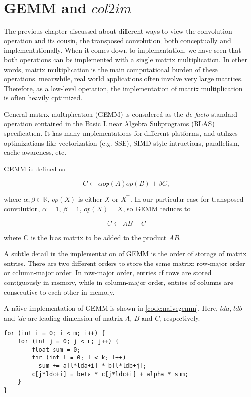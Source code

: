 
\chapter{GEMM and $col2im$}

The previous chapter discussed about different ways to view the convolution operation and its cousin,
the transposed convolution, both conceptually and implementationally. When it comes down to implementation,
we have seen that both operations can be implemented with a single matrix multiplication. In other words,
matrix multiplication is the main computational burden of these operations, meanwhile, real world applications
often involve very large matrices. Therefore, as a low-level operation, the implementation of matrix
multiplication is often heavily optimized.

General matrix multiplication (GEMM) is considered as the \textit{de facto} standard operation
contained in the Basic Linear Algebra Subprograms (BLAS) specification. It has many implementations for
different platforms, and utilizes optimizations like vectorization (e.g. SSE), SIMD-style intructions,
parallelism, cache-awareness, etc.


GEMM is defined as

$$C \leftarrow \alpha op(A) op(B) + \beta C,$$

where $\alpha, \beta \in \mathbb{R}$, $op(X)$ is either $X$ or $X^\intercal$. In our particular case for transposed convolution, $\alpha = 1$, $\beta = 1$, $op(X) = X$, so GEMM reduces to

$$C \leftarrow A B + C$$

where C is the bias matrix to be added to the product $A B$.

A subtle detail in the implementation of GEMM is the order of storage of matrix entries. There are two
different orders to store the same matrix: row-major order or column-major order. In row-major order,
entries of rows are stored contiguously in memory, while in column-major order, entries of columns are
consecutive to each other in memory.

A näive implementation of GEMM is shown in \ref{code:naivegemm}. Here, $lda$, $ldb$ and $ldc$ are leading
dimension of matrix $A$, $B$ and $C$, respectively.

\begin{code}
\begin{verbatim}
for (int i = 0; i < m; i++) {
    for (int j = 0; j < n; j++) {
        float sum = 0;
        for (int l = 0; l < k; l++)
          sum += a[l*lda+i] * b[l*ldb+j];
        c[j*ldc+i] = beta * c[j*ldc+i] + alpha * sum;
    }
}
\end{verbatim}
\label{code:naivegemm}
\end{code}

